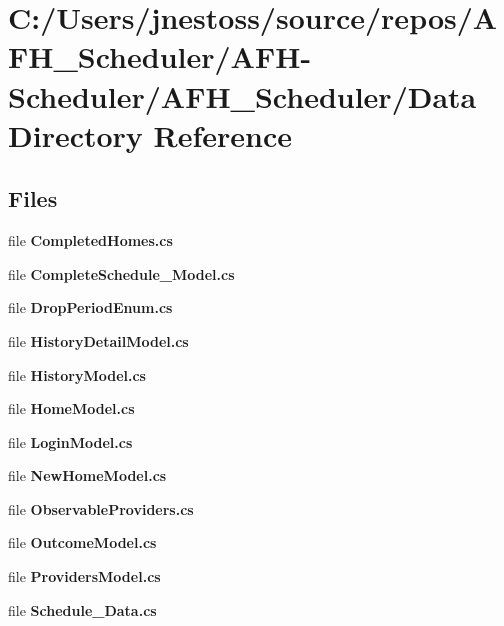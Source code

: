\section{C\+:/\+Users/jnestoss/source/repos/\+A\+F\+H\+\_\+\+Scheduler/\+A\+F\+H-\/\+Scheduler/\+A\+F\+H\+\_\+\+Scheduler/\+Data Directory Reference}
\label{dir_842e8a101fb650a72d0fffa9046aba30}
\subsection*{Files}
\begin{DoxyCompactItemize}
\item 
file \textbf{ Completed\+Homes.\+cs}
\item 
file \textbf{ Complete\+Schedule\+\_\+\+Model.\+cs}
\item 
file \textbf{ Drop\+Period\+Enum.\+cs}
\item 
file \textbf{ History\+Detail\+Model.\+cs}
\item 
file \textbf{ History\+Model.\+cs}
\item 
file \textbf{ Home\+Model.\+cs}
\item 
file \textbf{ Login\+Model.\+cs}
\item 
file \textbf{ New\+Home\+Model.\+cs}
\item 
file \textbf{ Observable\+Providers.\+cs}
\item 
file \textbf{ Outcome\+Model.\+cs}
\item 
file \textbf{ Providers\+Model.\+cs}
\item 
file \textbf{ Schedule\+\_\+\+Data.\+cs}
\end{DoxyCompactItemize}
